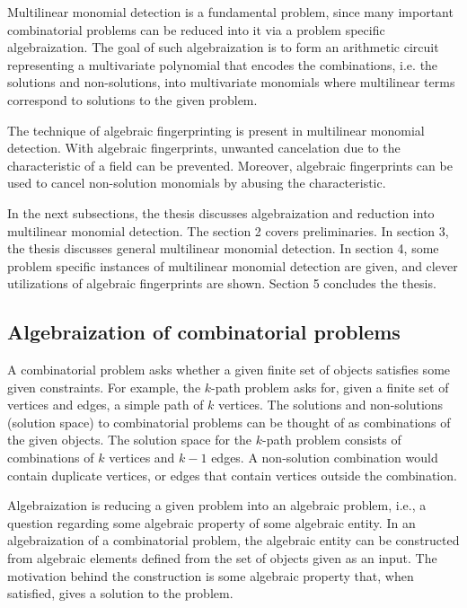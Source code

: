 Multilinear monomial detection 
is a fundamental problem, since many important combinatorial problems can be reduced into it 
via a problem specific algebraization. The goal of such algebraization is to form an arithmetic circuit representing a 
multivariate polynomial that encodes the combinations, i.e. the solutions and non-solutions, into multivariate monomials where 
multilinear terms correspond to solutions to the given problem.\nl

The technique of algebraic fingerprinting is present in multilinear monomial detection. 
With algebraic fingerprints, unwanted cancelation due to the characteristic of a field can be prevented. 
Moreover, algebraic fingerprints can be used to cancel non-solution monomials by abusing the characteristic.\nl

In the next subsections, the thesis discusses algebraization and reduction into multilinear monomial detection. 
The section 2 covers preliminaries. In section 3, the thesis discusses general multilinear monomial detection. 
In section 4, some problem specific instances of multilinear monomial detection are given, and clever 
utilizations of algebraic fingerprints are shown. Section 5 concludes the thesis.

\subsection{Algebraization of combinatorial problems}

A combinatorial problem asks whether a given finite set of objects satisfies some given constraints. 
For example, the $k$-path problem asks for, given a finite set of vertices and edges, 
a simple path of $k$ vertices. The solutions and non-solutions (solution space) to combinatorial problems can be thought of as 
combinations of the given objects. The solution space for the $k$-path problem consists of combinations of $k$ vertices and $k-1$ edges. 
A non-solution combination would contain duplicate vertices, or edges that contain vertices outside the combination.\nl

Algebraization is reducing a given problem into an algebraic problem, i.e., a question regarding some algebraic property of some algebraic entity. 
In an algebraization of a combinatorial problem, the algebraic entity can be constructed from algebraic elements defined from the 
set of objects given as an input. The motivation behind the construction is some algebraic property that, 
when satisfied, gives a solution to the problem.\nl

